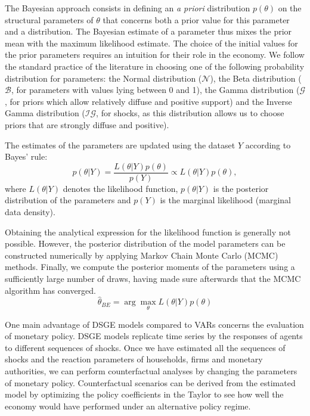 \documentclass[a4paper,12pt]{article}%
\begin{document}
The Bayesian approach consists in defining an \textit{a priori} distribution
$p(\theta)$ on the structural parameters of $\theta$ that concerns both a
prior value for this parameter and a distribution. The Bayesian estimate of a
parameter thus mixes the prior mean with the maximum likelihood estimate. The
choice of the initial values for the prior parameters requires an intuition
for their role in the economy. We follow the standard practice of the
literature in choosing one of the following probability distribution for
parameters: the Normal distribution ($\mathcal{N}$), the Beta distribution
($\mathcal{B}$, for parameters with values lying between 0 and 1), the Gamma
distribution ($\mathcal{G}$, for priors which allow relatively diffuse and
positive support) and the Inverse Gamma distribution ($\mathcal{IG}$, for
shocks, as this distribution allows us to choose priors that are strongly
diffuse and positive).

The estimates of the parameters are updated using the dataset $Y$ according to
Bayes' rule:
\begin{equation}
p(\theta|Y)=\frac{L(\theta|Y)p(\theta)}{p(Y)}\propto L(\theta|Y)p(\theta),
\end{equation}
where $L(\theta|Y)$ denotes the likelihood function, $p(\theta|Y)$ is the
posterior distribution of the parameters and $p(Y)$ is the marginal likelihood
(marginal data density).

Obtaining the analytical expression for the likelihood function is generally
not possible. However, the posterior distribution of the model parameters can
be constructed numerically by applying Markov Chain Monte Carlo (MCMC)
methods. Finally, we compute the posterior moments of the parameters using a
sufficiently large number of draws, having made sure afterwards that the MCMC
algorithm has converged.%
\begin{equation}
\hat{\theta}_{BE}=\arg\max_{\theta}L(\theta|Y)p(\theta)
\end{equation}


One main advantage of DSGE models compared to VARs concerns the evaluation of
monetary policy. DSGE models replicate time series by the responses of agents
to different sequences of shocks. Once we have estimated all the sequences of
shocks and the reaction parameters of households, firms and monetary
authorities, we can perform counterfactual analyses by changing the parameters
of monetary policy. Counterfactual scenarios can be derived from the estimated
model by optimizing the policy coefficients in the Taylor to see how well the
economy would have performed under an alternative policy regime.
\end{document}
